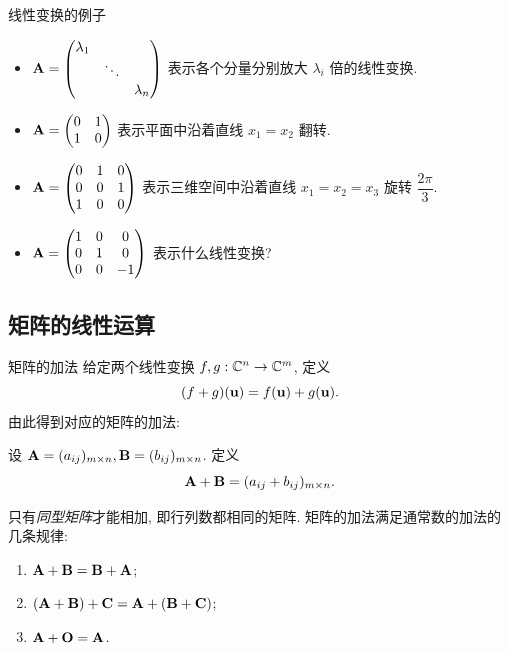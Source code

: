 \begin{frame}{线性变换的例子}
	\onslide<+->
	\begin{itemize}
		\item ${\mathbf{A}}=\begin{pmatrix}
			\lambda_1&&\\&\ddots&\\&&\lambda_n
		\end{pmatrix}$ 表示各个分量分别放大 $\lambda_i$ 倍的线性变换.
		\item ${\mathbf{A}}=\begin{pmatrix}
			0&1\\1&0
		\end{pmatrix}$ 表示平面中沿着直线 $x_1=x_2$ 翻转.
		\item ${\mathbf{A}}=\begin{pmatrix}
			0&1&0\\0&0&1\\1&0&0
		\end{pmatrix}$ 表示三维空间中沿着直线 $x_1=x_2=x_3$ 旋转 $\dfrac{2\pi}3$.
		\item ${\mathbf{A}}=\begin{pmatrix}
			1&0&0\\0&1&0\\0&0&-1
		\end{pmatrix}$ 表示什么线性变换?
	\end{itemize}
\end{frame}


\subsection{矩阵的线性运算}
\begin{frame}{矩阵的加法}
	\onslide<+->
	给定两个线性变换 $f,g:{\mathbb{C}}^n\rightarrow{\mathbb{C}}^m$, 定义
	\[(f+g)({\mathbf{u}})=f({\mathbf{u}})+g({\mathbf{u}}).\]
	\onslide<+->
	由此得到对应的矩阵的加法:
	\onslide<+->
	\begin{definition}
		设 ${\mathbf{A}}=(a_{ij})_{m\times n},{\mathbf{B}}=(b_{ij})_{m\times n}$.
		定义
		\[{\mathbf{A}}+{\mathbf{B}}=(a_{ij}+b_{ij})_{m\times n}.\]
	\end{definition}
	\onslide<+->
	只有\emph{同型矩阵}才能相加, 即行列数都相同的矩阵.
	\onslide<+->
	矩阵的加法满足通常数的加法的几条规律:
	\begin{enumerate}
		\item ${\mathbf{A}}+{\mathbf{B}}={\mathbf{B}}+{\mathbf{A}}$;
		\item $({\mathbf{A}}+{\mathbf{B}})+{\mathbf{C}}={\mathbf{A}}+({\mathbf{B}}+{\mathbf{C}})$;
		\item ${\mathbf{A}}+{\mathbf{O}}={\mathbf{A}}$.
	\end{enumerate}
\end{frame}


